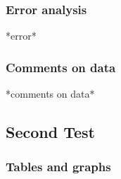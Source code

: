 \documentclass[
	letterpaper, %
	10pt, %
]{CSUniSchoolLabReport}
\newcommand{\dd}[0]{\text{d}}
\begin{document}

\subsubsection{Error analysis}
*error*

\subsubsection{Comments on data}
*comments on data*

\subsection{Second Test}
\subsubsection{Tables and graphs}



\end{document}
